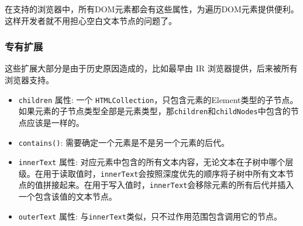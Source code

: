 在支持的浏览器中，所有DOM元素都会有这些属性，为遍历DOM元素提供便利。这样开发者就不用担心空白文本节点的问题了。

\subsubsection*{专有扩展}

这些扩展大部分是由于历史原因造成的，比如最早由 IR 浏览器提供，后来被所有浏览器支持。

\begin{itemize}
    \item \texttt{children} 属性: 一个 \texttt{HTMLCollection}，只包含元素的Element类型的子节点。如果元素的子节点类型全部是元素类型，那\texttt{children}和\texttt{childNodes}中包含的节点应该是一样的。
    \item \texttt{contains()}: 需要确定一个元素是不是另一个元素的后代。
    \item \texttt{innerText} 属性: 对应元素中包含的所有文本内容，无论文本在子树中哪个层级。在用于读取值时，\texttt{innerText}会按照深度优先的顺序将子树中所有文本节点的值拼接起来。在用于写入值时，\texttt{innerText}会移除元素的所有后代并插入一个包含该值的文本节点。
    \item \texttt{outerText} 属性: 与\texttt{innerText}类似，只不过作用范围包含调用它的节点。
\end{itemize}

\newpage